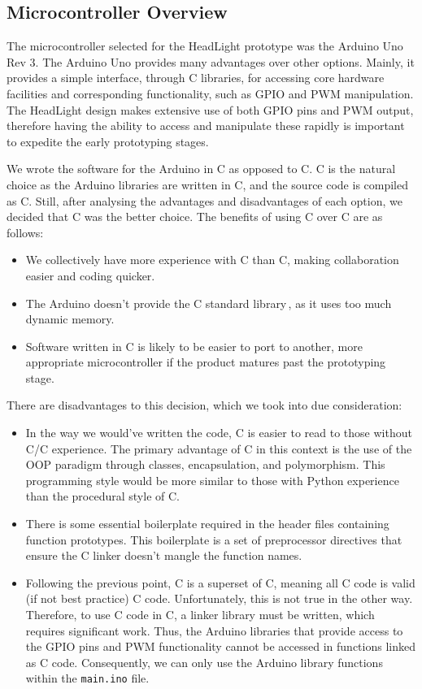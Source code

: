 \documentclass[twoside]{article}
\newcommand\CC{C\nolinebreak[4]\hspace{-.05em}\raisebox{.4ex}{\relsize{-3}{\textbf{++}}}}
\begin{document}
    \subsection{Microcontroller Overview}
        The microcontroller selected for the HeadLight prototype was the Arduino Uno Rev 3. The Arduino Uno provides many advantages over other options. Mainly, it provides a simple interface, through \CC{} libraries, for accessing core hardware facilities and corresponding functionality, such as GPIO and PWM manipulation. The HeadLight design makes extensive use of both GPIO pins and PWM output, therefore having the ability to access and manipulate these rapidly is important to expedite the early prototyping stages. 

        We wrote the software for the Arduino in C as opposed to \CC{}. \CC{} is the natural choice as the Arduino libraries are written in \CC{}, and the source code is compiled as \CC{}. Still, after analysing the advantages and disadvantages of each option, we decided that C was the better choice. The benefits of using C over \CC{} are as follows:
        \begin{itemize}
            \item We collectively have more experience with C than \CC{}, making collaboration easier and coding quicker.
            \item The Arduino doesn't provide the \CC{} standard library \cite{2017Arduino}, as it uses too much dynamic memory.
            \item Software written in C is likely to be easier to port to another, more appropriate microcontroller if the product matures past the prototyping stage. 
        \end{itemize}
        There are disadvantages to this decision, which we took into due consideration:
        \begin{itemize}
            \item In the way we would've written the code, \CC{} is easier to read to those without C/\CC{} experience. The primary advantage of \CC{} in this context is the use of the OOP paradigm through classes, encapsulation, and polymorphism. This programming style would be more similar to those with Python experience than the procedural style of C. 
            \item There is some essential boilerplate required in the header files containing function prototypes. This boilerplate is a set of preprocessor directives that ensure the \CC{} linker doesn't mangle the function names. 
            \item Following the previous point, \CC{} is a superset of C, meaning all C code is valid (if not best practice) \CC{} code. Unfortunately, this is not true in the other way. Therefore, to use \CC{} code in C, a linker library must be written, which requires significant work. Thus, the Arduino libraries that provide access to the GPIO pins and PWM functionality cannot be accessed in functions linked as C code. Consequently, we can only use the Arduino library functions within the \texttt{main.ino} file. 
        \end{itemize}
\end{document}
